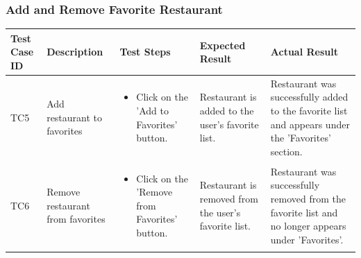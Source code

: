 \documentclass[12pt, a4paper, oneside]{article}
\begin{document}
\subsubsection{Add and Remove Favorite Restaurant}
\captionsetup{type=table}
\begin{tabularx}{\textwidth}{|X|X|X|X|X|}
	\hline
	\rowcolor{gray}
	\textbf{Test Case ID} & \textbf{Description} & \textbf{Test Steps} & \textbf{Expected Result} & \textbf{Actual Result} \\ \hline
	TC5 & Add restaurant to favorites & 
    \begin{itemize}[left=0pt, nosep]
        \item Click on the 'Add to Favorites' button.
    \end{itemize}
    & Restaurant is added to the user's favorite list. & Restaurant was successfully added to the favorite list and appears under the 'Favorites' section. \\ \hline
	TC6 & Remove restaurant from favorites & 
    \begin{itemize}[left=0pt, nosep]
        \item Click on the 'Remove from Favorites' button.
    \end{itemize}
    & Restaurant is removed from the user's favorite list. & Restaurant was successfully removed from the favorite list and no longer appears under 'Favorites'. \\ \hline
\end{tabularx}
\label{tab:fav-restaurant}
\end{document}
